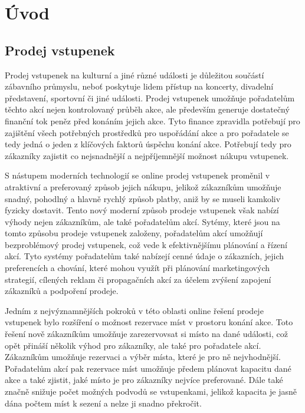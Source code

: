 \chapter*{Úvod}

\section*{Prodej vstupenek}
\label{sec:uvod-prodej-vstupenek}
Prodej vstupenek na kulturní a jiné různé události je důležitou součástí zábavního průmyslu, neboť poskytuje lidem přístup na koncerty, divadelní představení, sportovní či jiné události.
Prodej vstupenek umožňuje pořadatelům těchto akcí nejen kontrolovaný průběh akce, ale především generuje dostatečný finanční tok peněz před konáním jejich akce.
Tyto finance zpravidla potřebují pro zajištění všech potřebných prostředků pro uspořádání akce a pro pořadatele se tedy jedná o jeden z klíčových faktorů úspěchu konání akce.
Potřebují tedy pro zákazníky zajistit co nejsnadnější a nejpříjemnější možnost nákupu vstupenek.

S nástupem moderních technologií se online prodej vstupenek proměnil v atraktivní a preferovaný způsob jejich nákupu, jelikož zákazníkům umožňuje snadný, pohodlný a hlavně rychlý způsob platby, aniž by se museli kamkoliv fyzicky dostavit.
Tento nový moderní způsob prodeje vstupenek však nabízí výhody nejen zákazníkům, ale také pořadatelům akcí.
Sytémy, které jsou na tomto způsobu prodeje vstupenek založeny, pořadatelům akcí umožňují bezproblémový prodej vstupenek, což vede k efektivnějšímu plánování a řízení akcí.
Tyto systémy pořadatelům také nabízejí cenné údaje o zákazních, jejich preferencích a chování, které mohou využít při plánování marketingových strategií, cílených reklam či propagačních akcí za účelem zvýšení zapojení zákazníků a podpoření prodeje.

Jedním z nejvýznamnějších pokroků v této oblasti online řešení prodeje vstupenek bylo rozšíření o možnost rezervace míst v prostoru konání akce.
Toto řešení nově zákazníkům umožňuje zarezervovsat si místo na dané události, což opět přináší několik výhod pro zákazníky, ale také pro pořadatele akcí.
Zákazníkům umožňuje rezervaci a výběr místa, které je pro ně nejvhodnější.
Pořadatelům akcí pak rezervace míst umožňuje předem plánovat kapacitu dané akce a také zjistit, jaké místo je pro zákazníky nejvíce preferované.
Dále také značně snižuje počet možných podvodů se vstupenkami, jelikož kapacita je jasně dána počtem míst k sezení a nelze ji snadno překročit.

